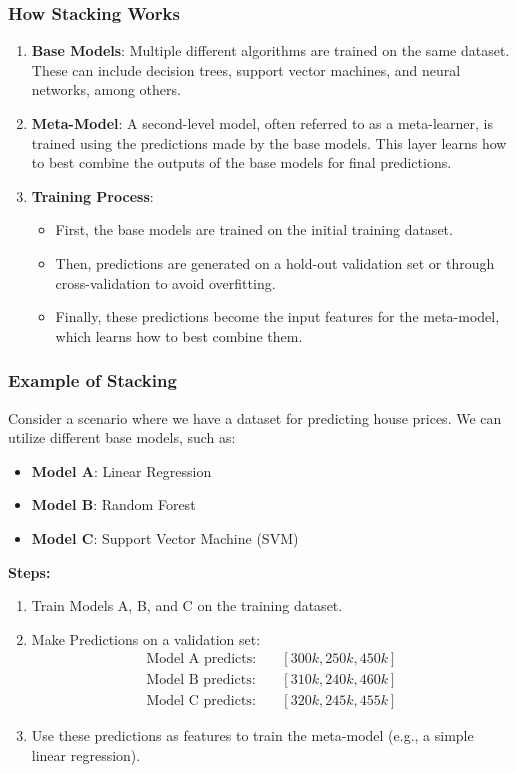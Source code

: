 \documentclass[aspectratio=169]{beamer}
\begin{document}
\begin{frame}[fragile]
    \frametitle{How Stacking Works}
    \begin{enumerate}
        \item \textbf{Base Models}: Multiple different algorithms are trained on the same dataset. 
        These can include decision trees, support vector machines, and neural networks, among others.
        
        \item \textbf{Meta-Model}: A second-level model, often referred to as a meta-learner, is trained 
        using the predictions made by the base models. This layer learns how to best combine 
        the outputs of the base models for final predictions.
        
        \item \textbf{Training Process}:
        \begin{itemize}
            \item First, the base models are trained on the initial training dataset.
            \item Then, predictions are generated on a hold-out validation set or through 
            cross-validation to avoid overfitting.
            \item Finally, these predictions become the input features for the meta-model, 
            which learns how to best combine them.
        \end{itemize}
    \end{enumerate}
\end{frame}

\begin{frame}[fragile]
    \frametitle{Example of Stacking}
    Consider a scenario where we have a dataset for predicting house prices. We can utilize 
    different base models, such as:
    \begin{itemize}
        \item \textbf{Model A}: Linear Regression
        \item \textbf{Model B}: Random Forest
        \item \textbf{Model C}: Support Vector Machine (SVM)
    \end{itemize}
    
    \textbf{Steps:}
    \begin{enumerate}
        \item Train Models A, B, and C on the training dataset.
        \item Make Predictions on a validation set:
        \[
        \begin{aligned}
            \text{Model A predicts:} & \quad [300k, 250k, 450k] \\
            \text{Model B predicts:} & \quad [310k, 240k, 460k] \\
            \text{Model C predicts:} & \quad [320k, 245k, 455k] 
        \end{aligned}
        \]
        \item Use these predictions as features to train the meta-model (e.g., a simple 
        linear regression).
    \end{enumerate}
\end{frame}
\end{document}
